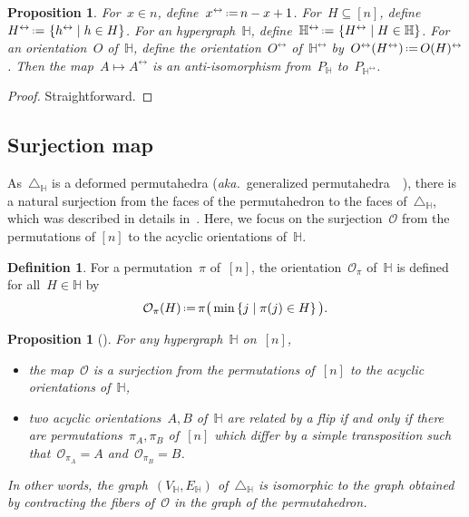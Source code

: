 \documentclass[reqno]{amsart}
\newtheorem{proposition}[theorem]{Proposition}
\theoremstyle{definition}
\newtheorem{definition}[theorem]{Definition}
\newcommand{\set}[2]{\left\{ #1 \;\middle|\; #2 \right\}} %
\newcommand{\eqdef}{\mbox{\,\raisebox{0.2ex}{\scriptsize\ensuremath{\mathrm:}}\ensuremath{=}\,}} %
\newcommand{\simplex}{\triangle} %
\newcommand{\aka}{\textit{aka.}~} %
\newcommand{\Or}{\mathcal O}  %
\newcommand{\HH}{\mathbb H}  %
\begin{document}
\begin{proposition}
\label{prop:antiIsomorphism}
For~$x \in n$, define~$x^\leftrightarrow \eqdef n-x+1$.
For~$H \subseteq [n]$, define~$H^\leftrightarrow \eqdef \set{h^\leftrightarrow}{h \in H}$.
For an hypergraph~$\HH$, define~$\HH^\leftrightarrow \eqdef \set{H^\leftrightarrow}{H \in \HH}$.
For an orientation~$O$ of~$\HH$, define the orientation~$O^\leftrightarrow$ of~$\HH^\leftrightarrow$ by~$O^\leftrightarrow(H^\leftrightarrow) \eqdef O(H)^\leftrightarrow$.
Then the map~$A \mapsto A^\leftrightarrow$ is an anti-isomorphism from~$P_\HH$ to~$P_{\HH^\leftrightarrow}$.
\end{proposition}

\begin{proof}
Straightforward.
\end{proof}


\subsection{Surjection map} 
\label{subsec:surjection}

As~$\simplex_\HH$ is a deformed permutahedra (\aka generalized permutahedra~~\cite{Postnikov, PostnikovReinerWilliams}), there is a natural surjection from the faces of the permutahedron to the faces of~$\simplex_\HH$, which was described in details in~\cite[Lem.~2.9]{BenedettiBergeronMachacek}.
Here, we focus on the surjection~$\Or$ from the permutations of $[n]$ to the acyclic orientations of~$\HH$.

\begin{definition}
\label{def:surjection}
For a permutation~$\pi$ of~$[n]$, the orientation~$\Or_\pi$ of~$\HH$ is defined for all~$H \in \HH$ by
\[
\Or_\pi(H) \eqdef  \pi\big(\min\set{j}{\pi(j)\in H}\big).
\]
\end{definition}

\begin{proposition}[{\cite[Lem.~2.9]{BenedettiBergeronMachacek}}]
For any hypergraph~$\HH$ on~$[n]$,
\begin{itemize}
\item the map~$\Or$ is a surjection from the permutations of~$[n]$ to the acyclic orientations of~$\HH$,
\item two acyclic orientations~$A,B$ of~$\HH$ are related by a flip if and only if there are permutations~$\pi_A, \pi_B$ of~$[n]$ which differ by a simple transposition such that~$\Or_{\pi_A} = A$ and~$\Or_{\pi_B} = B$.
\end{itemize}
In other words, the graph~$(V_\HH, E_\HH)$ of~$\simplex_\HH$ is isomorphic to the graph obtained by contracting the fibers of~$\Or$ in the graph of the permutahedron.
\end{proposition}
\end{document}
